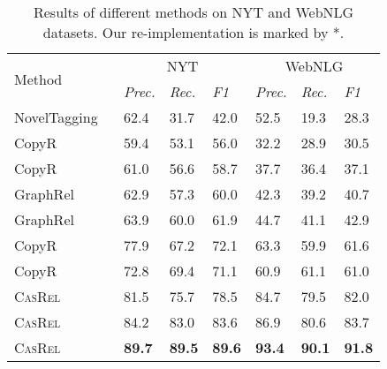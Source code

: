 \documentclass[11pt,a4paper]{article}
\begin{document}
\renewcommand{\arraystretch}{1} \begin{table*}[!tp] 
		\centering
		\small
		\begin{tabular}{lllllll} 
			\toprule
			\multirow{2}{*}{Method}& 
			\multicolumn{3}{c}{NYT}&\multicolumn{3}{c}{WebNLG}\\
			\cmidrule(lr){2-4} \cmidrule(lr){5-7} &\textit{Prec.}&\textit{Rec.}&\textit{F1}&\textit{Prec.}&\textit{Rec.}&\textit{F1}\\
			\midrule 
			NovelTagging
			~\cite{zheng2017Joint}
			&62.4&31.7&42.0&52.5&19.3&28.3\\ 
			CopyR
			~\cite{zeng2018Extracting}
			&59.4&53.1&56.0&32.2&28.9&30.5\\
			CopyR
			~\cite{zeng2018Extracting}
			&61.0&56.6&58.7&37.7&36.4&37.1\\
			GraphRel
			~\cite{fu2019GraphRel}
			&62.9&57.3&60.0&42.3&39.2&40.7\\
			GraphRel
			~\cite{fu2019GraphRel}
			&63.9&60.0&61.9&44.7&41.1&42.9\\
			CopyR
			~\cite{zeng2019Learning}
			&77.9&67.2&72.1&63.3&59.9&61.6\\
			CopyR
			&72.8&69.4&71.1&60.9&61.1&61.0\\
			\midrule
			\textsc{CasRel}&81.5&75.7&78.5&84.7&79.5&82.0\\
			\textsc{CasRel}&84.2&83.0&83.6&86.9&80.6&83.7\\
			\textsc{CasRel}&\textbf{89.7}& \textbf{89.5} &\textbf{89.6}&\textbf{93.4} & \textbf{90.1}&\textbf{91.8}\\
			\bottomrule 
		\end{tabular} 
		\caption{Results of different methods on NYT and WebNLG datasets. Our re-implementation is marked by *.}
		\label{tab:result} 
	\end{table*}
\end{document}
